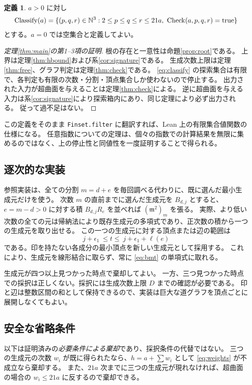 \documentclass[11pt,a4paper]{ltjsarticle}
\numberwithin{equation}{section}
\theoremstyle{definition}
\newtheorem{definition}[theorem]{定義}
\newcommand{\mf}{\mathfrak m}\newcommand{\NF}{\operatorname{NF}}\newcommand{\Frac}{\operatorname{Frac}}\newcommand{\trdeg}{\operatorname{trdeg}}\newcommand{\edim}{\operatorname{edim}}\newcommand{\lcm}{\operatorname{lcm}}\newcommand{\Span}{\operatorname{span}}\newcommand{\Classify}{\operatorname{Classify}}\newcommand{\CheckR}{\operatorname{Check}}\newcommand{\Admissible}{\operatorname{Admissible}}\newcommand{\ord}{\operatorname{ord}}
\begin{document}
\begin{definition}\label{def:classify}
$a>0$ に対し
\begin{equation}\label{eq:classify}
 \Classify(a)=\{(p,q,r)\in\N^3:
 2\le p\le q\le r\le21a,\ \CheckR(a,p,q,r)=\mathrm{true}\}
\end{equation}
とする。$a=0$ では空集合と定義してよい。
\end{definition}

\begin{proof}[定理\ref{thm:main}の第1--3項の証明]
根の存在と一意性は命題\ref{prop:root}である。
上界は定理\ref{thm:hbound}および系\ref{cor:signature}である。
生成次数上限は定理\ref{thm:free}、グラフ判定は定理\ref{thm:check}である。
\eqref{eq:classify} の探索集合は有限で、各判定も有限の次数・分割・頂点集合しか使わないので停止する。
出力された入力が超曲面を与えることは定理\ref{thm:check}による。
逆に超曲面を与える入力は系\ref{cor:signature}により探索箱内にあり、同じ定理により必ず出力される。
従って過不足はない。
\end{proof}
この定義をそのまま \texttt{Finset.filter} に翻訳すれば、Lean 上の有限集合値関数の仕様になる。
任意指数についての定理は、個々の指数での計算結果を無限に集めるのではなく、上の停止性と同値性を一度証明することで得られる。

\subsection{逐次的な実装}
参照実装は、全ての分割 $m=d+e$ を毎回調べる代わりに、既に選んだ最小生成元だけを使う。
次数 $m$ の直前までに選んだ生成元を $B_{d,j}$ とすると、$e=m-d>0$ に対する積
$B_{d,j}R_e$ を並べれば $(\mf^2)_m$ を張る。
実際、より低い次数の全ての元は帰納法により既存生成元の多項式であり、正次数の積から一つの生成元を取り出せる。
この一つの生成元に対する頂点または辺の範囲は
\[
 j+\epsilon_1\ \le t\le\ j+\epsilon_1+\ell(e)
\]
である。印を持たない各成分の最小頂点を新しい生成元として採用する。
これにより、生成元を線形結合に取らず、常に \eqref{eq:bmt} の単項式に取れる。

生成元が四つ以上見つかった時点で棄却してよい。
一方、三つ見つかった時点での採択は正しくない。採択には生成次数上限 $D$ までの確認が必要である。
印と辺は整数区間の和として保持できるので、実装は巨大な道グラフを頂点ごとに展開しなくてもよい。

\subsection{安全な省略条件}
以下は証明済みの\emph{必要条件による棄却}であり、採択条件の代替ではない。
三つの生成元の次数 $w_i$ が既に得られたなら、$h=a+\sum w_i$ として \eqref{eq:weights} が不成立なら棄却する。
また、$21a$ 次までに三つの生成元が現れなければ、超曲面の場合の $w_i\le21a$ に反するので棄却できる。
\end{document}
